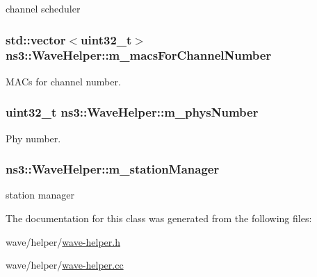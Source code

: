 channel scheduler 

\subsubsection[{\texorpdfstring{m\+\_\+macs\+For\+Channel\+Number}{m_macsForChannelNumber}}]{\setlength{\rightskip}{0pt plus 5cm}std\+::vector$<$uint32\+\_\+t$>$ ns3\+::\+Wave\+Helper\+::m\+\_\+macs\+For\+Channel\+Number\hspace{0.3cm}{\ttfamily [protected]}}\hypertarget{classns3_1_1WaveHelper_a2c3c091a1b0d1b3f901e33d2849fe817}{}\label{classns3_1_1WaveHelper_a2c3c091a1b0d1b3f901e33d2849fe817}


M\+A\+Cs for channel number. 

\subsubsection[{\texorpdfstring{m\+\_\+phys\+Number}{m_physNumber}}]{\setlength{\rightskip}{0pt plus 5cm}uint32\+\_\+t ns3\+::\+Wave\+Helper\+::m\+\_\+phys\+Number\hspace{0.3cm}{\ttfamily [protected]}}\hypertarget{classns3_1_1WaveHelper_a34634d5d3480ffdd4b9ecaa375d2888f}{}\label{classns3_1_1WaveHelper_a34634d5d3480ffdd4b9ecaa375d2888f}


Phy number. 

\subsubsection[{\texorpdfstring{m\+\_\+station\+Manager}{m_stationManager}}]{ ns3\+::\+Wave\+Helper\+::m\+\_\+station\+Manager\hspace{0.3cm}{\ttfamily [protected]}}\hypertarget{classns3_1_1WaveHelper_ad6f8c0136ece039608e1e8030e4cef14}{}\label{classns3_1_1WaveHelper_ad6f8c0136ece039608e1e8030e4cef14}


station manager 



The documentation for this class was generated from the following files\+:\begin{DoxyCompactItemize}
\item 
wave/helper/\hyperlink{wave-helper_8h}{wave-\/helper.\+h}\item 
wave/helper/\hyperlink{wave-helper_8cc}{wave-\/helper.\+cc}\end{DoxyCompactItemize}
